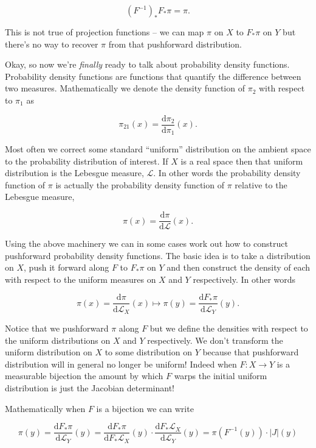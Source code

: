 \documentclass[
  letterpaper,
  DIV=11,
  numbers=noendperiod]{scrartcl}
\begin{document}
\[
(F^{-1})_{*} F_{*} \pi = \pi.
\]

This is not true of projection functions -- we can map \(\pi\) on \(X\)
to \(F_{*} \pi\) on \(Y\) but there's no way to recover \(\pi\) from
that pushforward distribution.

Okay, so now we're \emph{finally} ready to talk about probability
density functions. Probability density functions are functions that
quantify the difference between two measures. Mathematically we denote
the density function of \(\pi_{2}\) with respect to \(\pi_{1}\) as

\[
\pi_{21}(x) = \frac{ \mathrm{d} \pi_{2} }{ \mathrm{d} \pi_{1} } (x).
\]

Most often we correct some standard ``uniform'' distribution on the
ambient space to the probability distribution of interest. If \(X\) is a
real space then that uniform distribution is the Lebesgue measure,
\(\mathcal{L}\). In other words the probability density function of
\(\pi\) is actually the probability density function of \(\pi\) relative
to the Lebesgue measure,

\[
\pi(x) = \frac{ \mathrm{d} \pi }{ \mathrm{d} \mathcal{L} } (x).
\]

Using the above machinery we can in some cases work out how to construct
pushforward probability density functions. The basic idea is to take a
distribution on \(X\), push it forward along \(F\) to \(F_{*} \pi\) on
\(Y\) and then construct the density of each with respect to the uniform
measures on \(X\) and \(Y\) respectively. In other words

\[
\pi(x) = \frac{ \mathrm{d} \pi }{ \mathrm{d} \mathcal{L}_{X} } (x) \mapsto \pi(y) = \frac{ \mathrm{d} F_{*} \pi }{ \mathrm{d} \mathcal{L}_{Y} } (y).
\]

Notice that we pushforward \(\pi\) along \(F\) but we define the
densities with respect to the uniform distributions on \(X\) and \(Y\)
respectively. We don't transform the uniform distribution on \(X\) to
some distribution on \(Y\) because that pushforward distribution will in
general no longer be uniform! Indeed when \(F: X \rightarrow Y\) is a
measurable bijection the amount by which \(F\) warps the initial uniform
distribution is just the Jacobian determinant!

Mathematically when \(F\) is a bijection we can write

\[
\pi(y) = \frac{ \mathrm{d} F_{*} \pi }{ \mathrm{d} \mathcal{L}_{Y} } (y) = \frac{ \mathrm{d} F_{*} \pi }{ \mathrm{d} F_{*} \mathcal{L}_{X} } (y) \cdot \frac{ \mathrm{d} F_{*} \mathcal{L}_{X} }{ \mathrm{d} \mathcal{L}_{Y} } (y) = \pi(F^{-1}(y)) \cdot | J |(y)
\]
\end{document}
